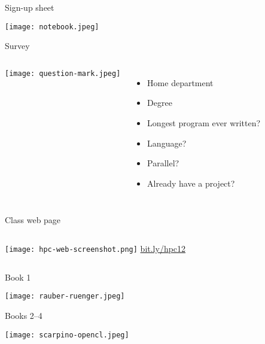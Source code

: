 \documentclass[english,compress]{beamer}
\begin{document}
\begin{frame}{Sign-up sheet}
  \begin{center}
    \texttt{[image: notebook.jpeg]}
  \end{center}
\end{frame}
\begin{frame}{Survey}
  \begin{columns}
    \texttt{[image: question-mark.jpeg]}
    \begin{itemize}[<+->]
      \item Home department
      \item Degree
      \item Longest program ever written?
      \item Language?
      \item Parallel?
      \item Already have a project?
    \end{itemize}
  \end{columns}
\end{frame}
\begin{frame}{Class web page}
  \begin{columns}
      \texttt{[image: hpc-web-screenshot.png]}
      \Huge
      \href{http://bit.ly/hpc12}{bit.ly/hpc12}
  \end{columns}
\end{frame}
\begin{frame}{Book 1}
  \begin{center}
    \texttt{[image: rauber-ruenger.jpeg]}
  \end{center}
\end{frame}
\begin{frame}{Books 2--4}
  \begin{center}
    \texttt{[image: scarpino-opencl.jpeg]}
  \end{center}
\end{frame}
\end{document}
